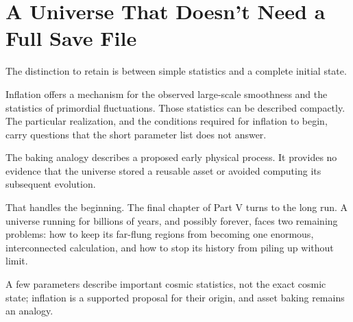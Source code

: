 \section{A Universe That Doesn't Need a Full Save File}

The distinction to retain is between simple statistics and a complete initial state.

Inflation offers a mechanism for the observed large-scale smoothness and the statistics of primordial fluctuations. Those statistics can be described compactly. The particular realization, and the conditions required for inflation to begin, carry questions that the short parameter list does not answer.

The baking analogy describes a proposed early physical process. It provides no evidence that the universe stored a reusable asset or avoided computing its subsequent evolution.

That handles the beginning. The final chapter of Part V turns to the long run. A universe running for billions of years, and possibly forever, faces two remaining problems: how to keep its far-flung regions from becoming one enormous, interconnected calculation, and how to stop its history from piling up without limit.

\begin{keytakeawaybox}
A few parameters describe important cosmic statistics, not the exact cosmic state; inflation is a supported proposal for their origin, and asset baking remains an analogy.
\end{keytakeawaybox}
